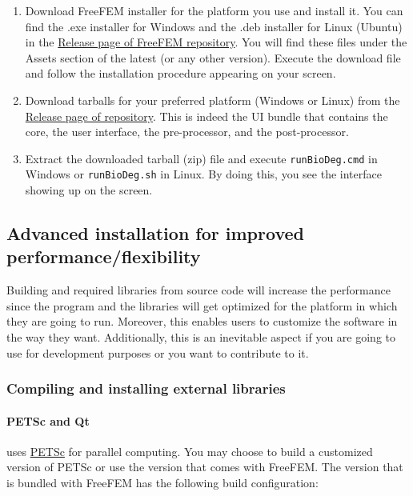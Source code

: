 \begin{enumerate}
\item
Download FreeFEM installer for the platform you use and install it. You can find the {.exe} installer for Windows and the {.deb} installer for Linux (Ubuntu) in the \href{https://github.com/FreeFem/FreeFem-sources/releases}{Release page of FreeFEM repository}. You will find these files under the Assets section of the latest (or any other version). Execute the download file and follow the installation procedure appearing on your screen.
\item
Download \biodeg{} tarballs for your preferred platform (Windows or Linux) from the \href{https://github.com/mbarzegary/BioDeg-UI/releases}{Release page of \biodeg{} repository}. This is indeed the \biodeg{} UI bundle that contains the \biodeg{} core, the user interface, the pre-processor, and the post-processor.
\item
Extract the downloaded tarball (zip) file and execute \verb|runBioDeg.cmd| in Windows or \verb|runBioDeg.sh| in Linux. By doing this, you see the \biodeg{} interface showing up on the screen.
\end{enumerate}




\subsection{Advanced installation for improved performance/flexibility}

Building \biodeg{} and required libraries from source code will increase the performance since the program and the libraries will get optimized for the platform in which they are going to run. Moreover, this enables users to customize the software in the way they want. Additionally, this is an inevitable aspect if you are going to use \biodeg{} for development purposes or you want to contribute to it.

\subsubsection{Compiling and installing external libraries}

\paragraph{PETSc and Qt}

\biodeg{} uses \href{https://petsc.org/release/}{PETSc} for parallel computing. You may choose to build a customized version of PETSc or use the version that comes with FreeFEM. The version that is bundled with FreeFEM has the following build configuration:

